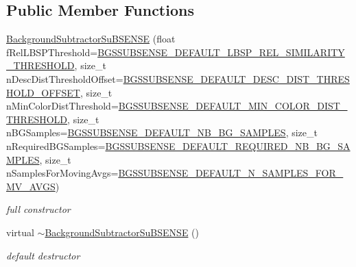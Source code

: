 \subsection*{Public Member Functions}
\begin{DoxyCompactItemize}
\item 
\mbox{\hyperlink{class_background_subtractor_su_b_s_e_n_s_e_a0f3118adf0f3365a140390c6ad94e9df}{Background\+Subtractor\+Su\+B\+S\+E\+N\+SE}} (float f\+Rel\+L\+B\+S\+P\+Threshold=\mbox{\hyperlink{_background_subtractor_su_b_s_e_n_s_e_8h_a125c1e09337744e8b4a35da8696dc5d4}{B\+G\+S\+S\+U\+B\+S\+E\+N\+S\+E\+\_\+\+D\+E\+F\+A\+U\+L\+T\+\_\+\+L\+B\+S\+P\+\_\+\+R\+E\+L\+\_\+\+S\+I\+M\+I\+L\+A\+R\+I\+T\+Y\+\_\+\+T\+H\+R\+E\+S\+H\+O\+LD}}, size\+\_\+t n\+Desc\+Dist\+Threshold\+Offset=\mbox{\hyperlink{_background_subtractor_su_b_s_e_n_s_e_8h_a6ac17a78aeb1fb0dab4833b50b80e43e}{B\+G\+S\+S\+U\+B\+S\+E\+N\+S\+E\+\_\+\+D\+E\+F\+A\+U\+L\+T\+\_\+\+D\+E\+S\+C\+\_\+\+D\+I\+S\+T\+\_\+\+T\+H\+R\+E\+S\+H\+O\+L\+D\+\_\+\+O\+F\+F\+S\+ET}}, size\+\_\+t n\+Min\+Color\+Dist\+Threshold=\mbox{\hyperlink{_background_subtractor_su_b_s_e_n_s_e_8h_ab2d581a6cf91dca26bb660c483cdb23c}{B\+G\+S\+S\+U\+B\+S\+E\+N\+S\+E\+\_\+\+D\+E\+F\+A\+U\+L\+T\+\_\+\+M\+I\+N\+\_\+\+C\+O\+L\+O\+R\+\_\+\+D\+I\+S\+T\+\_\+\+T\+H\+R\+E\+S\+H\+O\+LD}}, size\+\_\+t n\+B\+G\+Samples=\mbox{\hyperlink{_background_subtractor_su_b_s_e_n_s_e_8h_a0140353a9cb83ccce1209024d570ff28}{B\+G\+S\+S\+U\+B\+S\+E\+N\+S\+E\+\_\+\+D\+E\+F\+A\+U\+L\+T\+\_\+\+N\+B\+\_\+\+B\+G\+\_\+\+S\+A\+M\+P\+L\+ES}}, size\+\_\+t n\+Required\+B\+G\+Samples=\mbox{\hyperlink{_background_subtractor_su_b_s_e_n_s_e_8h_a3f30662673e2871e8f751e4ca1b433d1}{B\+G\+S\+S\+U\+B\+S\+E\+N\+S\+E\+\_\+\+D\+E\+F\+A\+U\+L\+T\+\_\+\+R\+E\+Q\+U\+I\+R\+E\+D\+\_\+\+N\+B\+\_\+\+B\+G\+\_\+\+S\+A\+M\+P\+L\+ES}}, size\+\_\+t n\+Samples\+For\+Moving\+Avgs=\mbox{\hyperlink{_background_subtractor_su_b_s_e_n_s_e_8h_acf2f1c0462353ddc7a51a6ed995a36ab}{B\+G\+S\+S\+U\+B\+S\+E\+N\+S\+E\+\_\+\+D\+E\+F\+A\+U\+L\+T\+\_\+\+N\+\_\+\+S\+A\+M\+P\+L\+E\+S\+\_\+\+F\+O\+R\+\_\+\+M\+V\+\_\+\+A\+V\+GS}})
\begin{DoxyCompactList}\small\item\em full constructor \end{DoxyCompactList}\item 
virtual \mbox{\hyperlink{class_background_subtractor_su_b_s_e_n_s_e_a71cd501469582addfe4f8824cc4602d4}{$\sim$\+Background\+Subtractor\+Su\+B\+S\+E\+N\+SE}} ()
\begin{DoxyCompactList}\small\item\em default destructor \end{DoxyCompactList}\item 

\end{DoxyCompactItemize}
